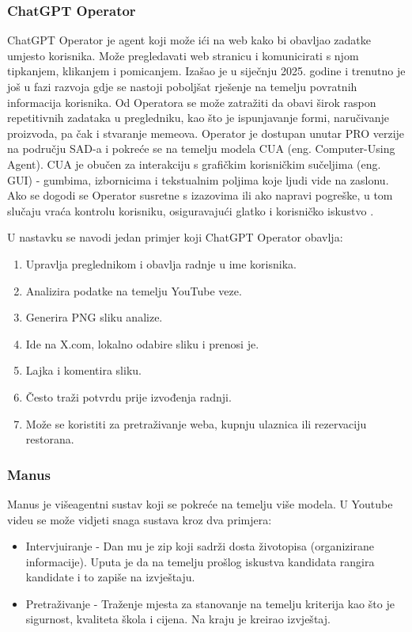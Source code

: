 \documentclass[]{foi}
\begin{document}
\subsubsection{ChatGPT Operator}
ChatGPT Operator je agent koji može ići na web kako bi obavljao zadatke umjesto korisnika. Može pregledavati web stranicu i komunicirati s njom tipkanjem, klikanjem i pomicanjem.
Izašao je u siječnju 2025. godine i trenutno je još u fazi razvoja gdje se nastoji poboljšat rješenje na temelju povratnih informacija korisnika. Od Operatora se može zatražiti da obavi
širok raspon repetitivnih zadataka u pregledniku, kao što je ispunjavanje formi, naručivanje proizvoda, pa čak i stvaranje memeova. Operator je dostupan unutar PRO verzije na području SAD-a i pokreće se
na temelju modela CUA (eng. Computer-Using Agent). CUA je obučen za interakciju s grafičkim korisničkim sučeljima (eng. GUI) - gumbima, izbornicima i tekstualnim poljima koje ljudi vide na zaslonu.
Ako se dogodi se Operator susretne s izazovima ili ako napravi pogreške, u tom slučaju vraća kontrolu korisniku, osiguravajući glatko i korisničko iskustvo \cite{openai2024operator}. 

U nastavku se navodi jedan primjer koji ChatGPT Operator obavlja:
\begin{enumerate}
    \item Upravlja preglednikom i obavlja radnje u ime korisnika.
    \item Analizira podatke na temelju YouTube veze.
    \item Generira PNG sliku analize.
    \item Ide na X.com, lokalno odabire sliku i prenosi je.
    \item Lajka i komentira sliku.
    \item Često traži potvrdu prije izvođenja radnji.
    \item Može se koristiti za pretraživanje weba, kupnju ulaznica ili rezervaciju restorana.
\end{enumerate}
\newpage

\subsubsection{Manus}

Manus je višeagentni sustav koji se pokreće na temelju više modela. U Youtube videu \cite{manus} se može vidjeti snaga sustava kroz dva primjera:
\begin{itemize}
    \item Intervjuiranje - Dan mu je zip koji sadrži dosta životopisa (organizirane informacije). Uputa je da na temelju prošlog iskustva kandidata rangira kandidate i to zapiše na izvještaju.
    \item Pretraživanje - Traženje mjesta za stanovanje na temelju kriterija kao što je  sigurnost, kvaliteta škola i cijena. Na kraju je kreirao izvještaj.
\end{itemize}
\end{document}
